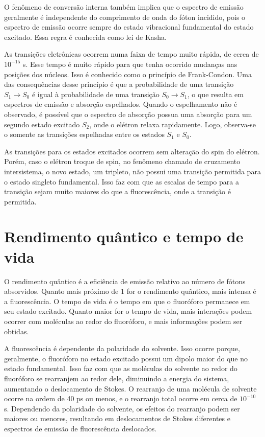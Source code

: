 		O fenômeno de conversão interna também implica que o espectro de emissão geralmente é independente do comprimento de onda do fóton incidido, pois o espectro de emissão ocorre sempre do estado vibracional fundamental do estado excitado. Essa regra é conhecida como lei de Kasha. 
		
		As transições eletrônicas ocorrem numa faixa de tempo muito rápida, de cerca de \(10^{-15}\) s. Esse tempo é muito rápido para que tenha ocorrido mudanças nas posições dos núcleos. Isso é conhecido como o princípio de Frank-Condon.  Uma das consequências desse princípio é que a probabilidade de uma transição \(S_1 \to S_0\) é igual à probabilidade de uma transição \(S_0 \to S_1\), o que resulta em espectros de emissão e absorção espelhados. Quando o espelhamento não é observado, é possível que o espectro de absorção possua uma absorção para um segundo estado excitado \(S_2\), onde o elétron relaxa rapidamente. Logo, observa-se o somente as transições espelhadas entre os estados \(S_1\) e \(S_0\).
			
		As transições para os estados excitados ocorrem sem alteração do spin do elétron. Porém, caso o elétron troque de spin, no fenômeno chamado de cruzamento intersistema,  o novo estado, um tripleto, não possui uma transição permitida para o estado singleto fundamental. Isso faz com que as escalas de tempo para a transição sejam muito maiores do que a fluorescência, onde a transição é permitida.
		

		\section{Rendimento quântico e tempo de vida} 
				
		O rendimento quântico é a eficiência de emissão relativo ao número de fótons absorvidos. Quanto mais próximo de 1 for o rendimento quântico, mais intensa é a fluorescência. O tempo de vida é o tempo em que o fluoróforo permanece em seu estado excitado. Quanto maior for o tempo de vida, mais interações podem ocorrer com moléculas ao redor do fluoróforo, e mais informações podem ser obtidas. 
		
		A fluorescência é dependente da polaridade do solvente.  Isso ocorre porque, geralmente, o fluoróforo no estado excitado possui um dipolo maior do que no estado fundamental. Isso faz com que as moléculas do solvente ao redor do fluoróforo se rearranjem ao redor dele, diminuindo a energia do sistema, aumentando o deslocamento de Stokes. O rearranjo de uma molécula de solvente ocorre na ordem de 40 ps ou menos, e o rearranjo total ocorre em cerca de \(10^{-10}\) s. Dependendo da polaridade do solvente, os efeitos do rearranjo podem ser maiores ou menores, resultando em deslocamentos de Stokes diferentes e espectros de emissão de fluorescência deslocados.
		
